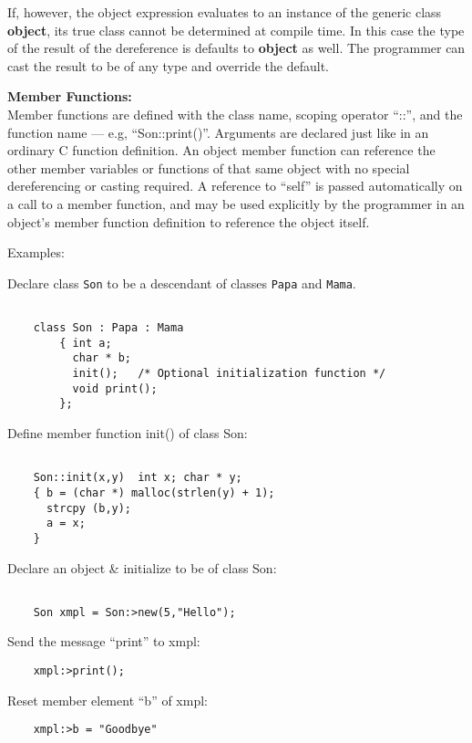 If, however, the object expression evaluates to an instance of the
generic class
{\bf object},
its true class cannot be determined at compile time.  In this
case the type of the result of the dereference is defaults to
{\bf object}
as well.  The programmer can cast the result to be of
any type and override the default.

{\flushleft \bf Member Functions:}\\
Member functions are defined with the class name, scoping operator 
``::'', and the
function name --- e.g, ``Son::print()''.   Arguments are declared just like in
an ordinary C function definition.  An object member function can reference
the other
member variables or functions
of that same object with no special dereferencing or casting
required.  A reference to ``self'' is passed automatically on a call to a
member function, and may be used explicitly by the programmer
in an object's member function definition to
reference the object itself.



Examples:

Declare class {\tt Son} to be a descendant of classes
{\tt Papa} and {\tt Mama}.

\begin{verbatim}

	class Son : Papa : Mama
		{ int a;
		  char * b;
		  init();	/* Optional initialization function */
		  void print();
		};

\end{verbatim}

Define member function init() of class Son:

\begin{verbatim}

	Son::init(x,y)	int x; char * y;
	{ b = (char *) malloc(strlen(y) + 1);
	  strcpy (b,y);
	  a = x;
	}

\end{verbatim}

Declare an object \& initialize to be of class Son:

\begin{verbatim}

	Son xmpl = Son:>new(5,"Hello");

\end{verbatim}


Send the message ``print'' to xmpl:

\begin{verbatim}
	xmpl:>print();
\end{verbatim}

Reset member element ``b'' of xmpl:

\begin{verbatim}
	xmpl:>b = "Goodbye"
\end{verbatim}
